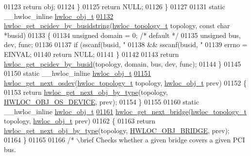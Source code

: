 \begin{DoxyCode}
01123       \textcolor{keywordflow}{return} obj;
01124   \}
01125   \textcolor{keywordflow}{return} NULL;
01126 \}
01127 
01131 \textcolor{keyword}{static} \_\_hwloc\_inline \hyperlink{a00238}{hwloc\_obj\_t}
\hyperlink{a00204_ga23a978469353134b3104b846fe2efceb}{01132} \hyperlink{a00204_ga23a978469353134b3104b846fe2efceb}{hwloc\_get\_pcidev\_by\_busidstring}(\hyperlink{a00186_ga9d1e76ee15a7dee158b786c30b6a6e38}{hwloc\_topology\_t} topology, \textcolor{keyword}{
      const} \textcolor{keywordtype}{char} *busid)
01133 \{
01134   \textcolor{keywordtype}{unsigned} domain = 0; \textcolor{comment}{/* default */}
01135   \textcolor{keywordtype}{unsigned} bus, dev, func;
01136 
01137   \textcolor{keywordflow}{if} (sscanf(busid, \textcolor{stringliteral}{"%
01138       && sscanf(busid, \textcolor{stringliteral}{"%
01139     errno = EINVAL;
01140     \textcolor{keywordflow}{return} NULL;
01141   \}
01142 
01143   \textcolor{keywordflow}{return} \hyperlink{a00204_gacdbaf0db98872e224b7883a84bfb0455}{hwloc\_get\_pcidev\_by\_busid}(topology, domain, bus, dev, func);
01144 \}
01145 
01150 \textcolor{keyword}{static} \_\_hwloc\_inline \hyperlink{a00238}{hwloc\_obj\_t}
\hyperlink{a00204_ga8b4584c8949e2c5f1c97ba7fe92b8145}{01151} \hyperlink{a00204_ga8b4584c8949e2c5f1c97ba7fe92b8145}{hwloc\_get\_next\_osdev}(\hyperlink{a00186_ga9d1e76ee15a7dee158b786c30b6a6e38}{hwloc\_topology\_t} topology, 
      \hyperlink{a00238}{hwloc\_obj\_t} prev)
01152 \{
01153   \textcolor{keywordflow}{return} \hyperlink{a00187_ga759e88eaf5a230ad283e9d4c42486735}{hwloc\_get\_next\_obj\_by\_type}(topology, 
      \hyperlink{a00184_ggacd37bb612667dc437d66bfb175a8dc55a51e7280240fd9f25589cbbe538bdb075}{HWLOC\_OBJ\_OS\_DEVICE}, prev);
01154 \}
01155 
01160 \textcolor{keyword}{static} \_\_hwloc\_inline \hyperlink{a00238}{hwloc\_obj\_t}
\hyperlink{a00204_ga9dba22a3f4f701f2a46780ba9a0bbbe7}{01161} \hyperlink{a00204_ga9dba22a3f4f701f2a46780ba9a0bbbe7}{hwloc\_get\_next\_bridge}(\hyperlink{a00186_ga9d1e76ee15a7dee158b786c30b6a6e38}{hwloc\_topology\_t} topology, 
      \hyperlink{a00238}{hwloc\_obj\_t} prev)
01162 \{
01163   \textcolor{keywordflow}{return} \hyperlink{a00187_ga759e88eaf5a230ad283e9d4c42486735}{hwloc\_get\_next\_obj\_by\_type}(topology, 
      \hyperlink{a00184_ggacd37bb612667dc437d66bfb175a8dc55a6825f10895fea60aca7a6ba9fe273db0}{HWLOC\_OBJ\_BRIDGE}, prev);
01164 \}
01165 
01166 \textcolor{comment}{/* \(\backslash\)brief Checks whether a given bridge covers a given PCI bus.}
}}
\end{DoxyCode}
